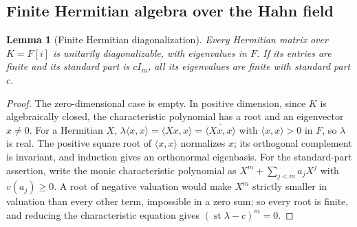 \documentclass[11pt,a4paper]{article}
\numberwithin{equation}{section}
\newtheorem{lemma}[lemma]{Lemma}
\theoremstyle{definition}
\theoremstyle{remark}
\newcommand{\K}{K}
\newcommand{\Fld}{F}
\newcommand{\st}{\operatorname{st}}
\newcommand{\ip}[2]{\langle#1,#2\rangle}
\begin{document}
\subsection{Finite Hermitian algebra over the Hahn field}\label{ihs:fr:sec:hermitian}
\begin{lemma}[Finite Hermitian diagonalization]\label{ihs:fr:lem:hermitian}
Every Hermitian matrix over $\K=\Fld[i]$ is unitarily diagonalizable, with
eigenvalues in $\Fld$. If its entries are finite and its standard part is
$cI_m$, all its eigenvalues are finite with standard part $c$.
\end{lemma}
\begin{proof}
The zero-dimensional case is empty. In positive dimension, since $\K$ is
algebraically closed, the characteristic polynomial has a root
and an eigenvector $x\ne0$. For a Hermitian $X$,
$\lambda\ip xx=\ip{Xx}x=\overline{\ip{Xx}x}$ with $\ip xx>0$ in $\Fld$, so
$\lambda$ is real. The positive square root of $\ip xx$ normalizes $x$; its
orthogonal complement is invariant, and induction gives an orthonormal
eigenbasis. For the standard-part assertion, write the monic characteristic
polynomial as $X^m+\sum_{j<m}a_jX^j$ with $v(a_j)\ge0$. A root of negative
valuation would make $X^m$ strictly smaller in valuation than every other
term, impossible in a zero sum; so every root is finite, and reducing the
characteristic equation gives $(\st\lambda-c)^m=0$.
\end{proof}
\end{document}
